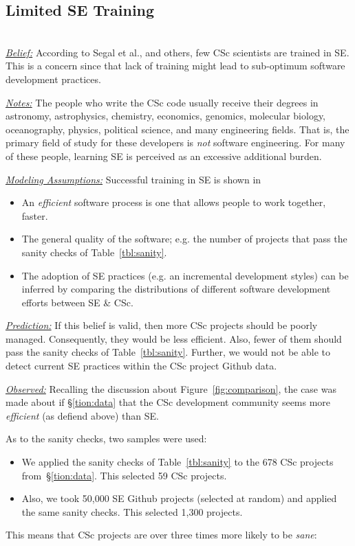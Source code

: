 \documentclass[conference,10pt]{IEEEtran}
\newcommand{\bi}{\begin{itemize}}
\newcommand{\ei}{\end{itemize}}
\begin{document}
\subsection{Limited SE Training} ~\\
\noindent \textit{\underline{Belief:}} According to Segal et al.,
and others\cite{segal07_enduser, basili08_hpc, carver13_perception, easterbrook_cs, sanders08_risk}, few CSc scientists are trained in SE.
This is a concern since that lack of training might lead to sub-optimum software
development practices.

\noindent \textit{\underline{Notes:}} 
The people who write the CSc code usually
receive their degrees in
astronomy, astrophysics, chemistry, economics, genomics, molecular biology, oceanography, physics, political science, and many engineering fields.
That is, the primary field of study for these developers is {\em not}
software engineering. For many of these people,
learning SE is perceived as an excessive additional burden\cite{boyle09_lessons}. 

\noindent \textit{\underline{Modeling Assumptions:}} 
Successful training in SE is shown in
\bi
\item An {\em efficient} software process is one that allows  people to work together, faster. 
\item The general quality of the software; e.g. the number of projects that pass the sanity checks of Table~\ref{tbl:sanity}.
\item The adoption of SE practices (e.g. an incremental development styles) can be inferred by comparing the distributions of different software development efforts between SE \& CSc.
\ei

\noindent \textit{\underline{Prediction:}} If this belief is valid, then more CSc
projects should be poorly managed. Consequently, they would be less efficient. Also, fewer of them should
pass the sanity checks of Table~\ref{tbl:sanity}.
Further, we would not be able to detect current SE  practices within the CSc project Github data.

\noindent \textit{\underline{Observed:}}
Recalling  the discussion about 
Figure~\ref{fig:comparison},
the case was made about if \S\ref{tion:data} that the CSc development community
seems more {\em efficient} (as defiend above) than SE. 

As to the sanity checks, 
two samples were used:
\bi
\item
We applied the sanity checks
of Table~\ref{tbl:sanity} to the 678 CSc projects from~\S\ref{tion:data}. This selected 59 CSc projects.
\item
Also, we took 50,000 SE Github projects (selected at random) and applied
the same sanity checks. This selected 1,300 projects.
\ei
This means that CSc projects are over three times more likely to be {\em sane}: 
\end{document}
